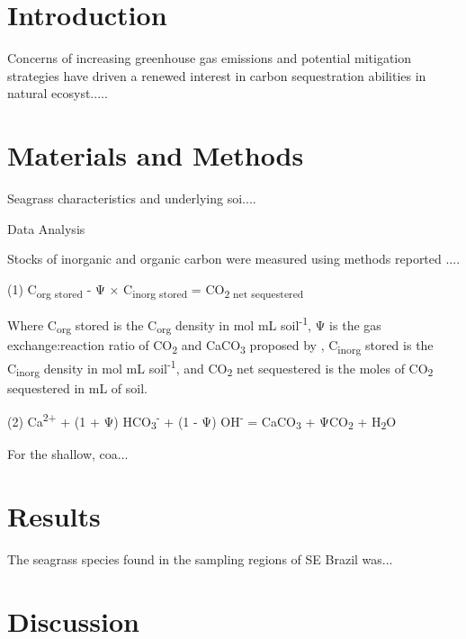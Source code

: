 \section{Introduction}
Concerns of increasing greenhouse gas emissions and potential mitigation strategies have driven a renewed interest in carbon sequestration abilities in natural ecosyst.....



\section{Materials and Methods}

Seagrass characteristics and underlying soi....

\bigskip
\noindent Data Analysis
\medskip


Stocks of inorganic and organic carbon were measured using methods reported ....

\bigskip
\hspace*{\fill}(1)	C\textsubscript{org stored} -  Ψ × C\textsubscript{inorg stored} = CO\textsubscript{2 net sequestered} \hspace*{\fill}
\bigskip

\noindent Where C\textsubscript{org} stored is the C\textsubscript{org} density in mol mL soil\textsuperscript{-1}, Ψ is the gas exchange:reaction ratio of CO\textsubscript{2} and CaCO\textsubscript{3} proposed by \citet{Smith:2013fv}, C\textsubscript{inorg} stored is the C\textsubscript{inorg} density in mol mL soil\textsuperscript{-1}, and CO\textsubscript{2} net sequestered is the moles of CO\textsubscript{2} sequestered in mL of soil.

\bigskip
\hspace*{\fill}(2)	Ca\textsuperscript{2+} + (1 + Ψ) HCO\textsubscript{3}\textsuperscript{-} + (1 - Ψ) OH\textsuperscript{-} = CaCO\textsubscript{3} + ΨCO\textsubscript{2} + H\textsubscript{2}O \hspace*{\fill}
\bigskip

\noindent For the shallow, coa...



\section{Results}

The seagrass species found in the sampling regions of SE Brazil was...

\section{Discussion}

